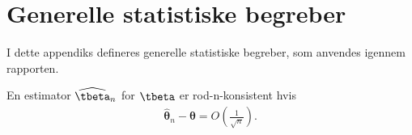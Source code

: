 \chapter{Generelle statistiske begreber}
I dette appendiks defineres generelle statistiske begreber, som anvendes igennem rapporten.
%
%
\begin{defn} \label{def:rodn}
En estimator \(\widehat{\tbeta}_n\) for \(\tbeta\) er rod-n-konsistent hvis
\begin{align*}
\boldsymbol {\hat{\theta}}_n  - \boldsymbol{\theta} = O \left( \frac{1}{\sqrt{n}} \right).
\end{align*}
\end{defn}

